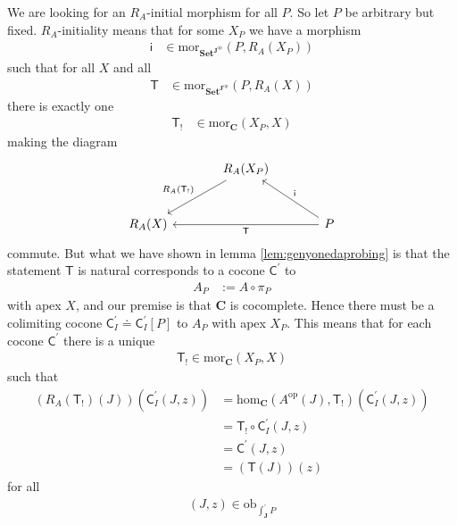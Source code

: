 \begin{prf}
We are looking for an $R_{A}$-initial morphism for all $P$.
So let $P$ be arbitrary but fixed.
$R_{A}$-initiality means that for some $X_{P}$ we have a morphism
\begin{align*}
  \mathsf{i}
  &\in
  \mathrm{mor}_{\mathbf{Set}^{\mathbf{J}^{\textrm{op}}}}(P,R_{A}(X_{P}))
\end{align*}
such that for all $X$ and all
\begin{align*}
  \mathsf{T}
  &\in
  \mathrm{mor}_{\mathbf{Set}^{\mathbf{J}^{\textrm{op}}}}(P,R_{A}(X))
\end{align*}
there is exactly one
\begin{align*}
  \mathsf{T}_{!}
  &\in
  \mathrm{mor}_{\mathbf{C}}(X_{P},X)
\end{align*}
making the diagram
\[
\begin{tikzcd}[sep=large]
  &
  R_{A}(X_{P})
  \arrow[swap]{dl}{R_{A}(\mathsf{T}_{!})}
  &
  \\
  R_{A}(X)
  &
  &
  P
  \arrow{ll}{\mathsf{T}}
  \arrow[swap]{lu}{\mathsf{i}}
\end{tikzcd}
\]
commute.
But what we have shown in lemma \ref{lem:genyonedaprobing} is that the statement {\glqq}$\mathsf{T}$ is natural{\grqq} corresponds to a cocone $\mathsf{C}^{\prime}$ to
\begin{align*}
  A_{P}
  &:=
  A
  \circ
  \pi_{P}
\end{align*}
with apex $X$, and our premise is that $\mathbf{C}$ is cocomplete.
Hence there must be a colimiting cocone $\mathsf{C}_{I}^{\prime} \doteq \mathsf{C}_{I}^{\prime}[P]$ to $A_{P}$ with apex $X_{P}$.
This means that for each cocone $\mathsf{C}^{\prime}$ there is a unique
\begin{align*}
  \mathsf{T}_{!}
  \in
  \mathrm{mor}_{\mathbf{C}}(X_{P},X)
\end{align*}
such that
\begin{align*}
  \left(
    R_{A}(\mathsf{T}_{!})(J)
  \right)
  \left(
    \mathsf{C}_{I}^{\prime}(J,z)
  \right)
  &=
  \mathrm{hom}_{\mathbf{C}}(A^{\textrm{op}}(J),\mathsf{T}_{!})
  \left(
    \mathsf{C}_{I}^{\prime}(J,z)
  \right)
  \\
  &=
  \mathsf{T}_{!}
  \circ
  \mathsf{C}_{I}^{\prime}(J,z)
  \\
  &=
  \mathsf{C}^{\prime}(J,z)
  \\
  &=
  (\mathsf{T}(J))(z)
\end{align*}
for all
\begin{align*}
  (J,z)
  \in
  \mathrm{ob}_{\int_{\mathbf{J}}^{\prime}P}

\end{align*}
\end{prf}
